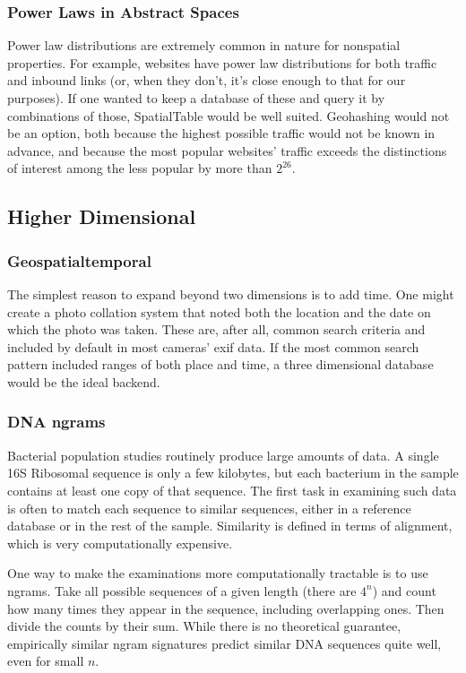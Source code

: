 \documentclass[11pt]{article}
\begin{document}
\subsubsection{Power Laws in Abstract Spaces}

Power law distributions are extremely common in nature for nonspatial properties.  For example, websites have power law distributions for both traffic and inbound links (or, when they don't, it's close enough to that for our purposes)\cite{powlaw}.  If one wanted to keep a database of these and query it by combinations of those, SpatialTable would be well suited.  Geohashing would not be an option, both because the highest possible traffic would not be known in advance, and because the most popular websites' traffic exceeds the distinctions of interest among the less popular by more than $2^{26}$.

\subsection{Higher Dimensional}

\subsubsection{Geospatialtemporal}

The simplest reason to expand beyond two dimensions is to add time.  One might create a photo collation system that noted both the location and the date on which the photo was taken.  These are, after all, common search criteria and included by default in most cameras' exif data.  If the most common search pattern included ranges of both place and time, a three dimensional database would be the ideal backend. 

\subsubsection{DNA ngrams}

Bacterial population studies routinely produce large amounts of data.  A single 16S Ribosomal sequence is only a few kilobytes, but each bacterium in the sample contains at least one copy of that sequence.  The first task in examining such data is often to match each sequence to similar sequences, either in a reference database or in the rest of the sample.  Similarity is defined in terms of alignment, which is very computationally expensive.

One way to make the examinations more computationally tractable is to use ngrams.  Take all possible sequences of a given length (there are $4^n$) and count how many times they appear in the sequence, including overlapping ones.  Then divide the counts by their sum.  While there is no theoretical guarantee, empirically similar ngram signatures predict similar DNA sequences quite well, even for small $n$.\cite{dna}
\end{document}
